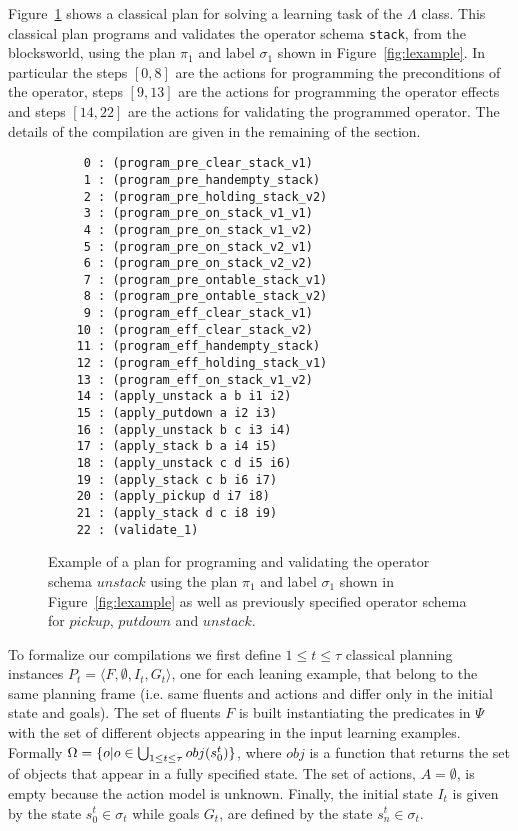 \documentclass[letterpaper]{article} %
\newcommand{\tup}[1]{{\langle #1 \rangle}}
\begin{document}
Figure~\ref{fig:plan} shows a classical plan for solving a learning task of the $\Lambda$ class. This classical plan programs and validates the operator schema {\tt\small stack}, from the blocksworld, using the plan $\pi_1$ and label $\sigma_1$ shown in Figure~\ref{fig:lexample}. In particular the steps $[0,8]$ are the actions for programming the preconditions of the operator, steps $[9,13]$ are the actions for programming the operator effects and steps $[14,22]$ are the actions for validating the programmed operator. The details of the compilation are given in the remaining of the section.

\begin{figure}[hbt]
\begin{scriptsize}
\begin{verbatim}
     0 : (program_pre_clear_stack_v1)
     1 : (program_pre_handempty_stack)
     2 : (program_pre_holding_stack_v2)
     3 : (program_pre_on_stack_v1_v1)
     4 : (program_pre_on_stack_v1_v2)
     5 : (program_pre_on_stack_v2_v1)
     6 : (program_pre_on_stack_v2_v2)
     7 : (program_pre_ontable_stack_v1)
     8 : (program_pre_ontable_stack_v2)
     9 : (program_eff_clear_stack_v1)
    10 : (program_eff_clear_stack_v2)
    11 : (program_eff_handempty_stack)
    12 : (program_eff_holding_stack_v1)
    13 : (program_eff_on_stack_v1_v2)
    14 : (apply_unstack a b i1 i2)
    15 : (apply_putdown a i2 i3)
    16 : (apply_unstack b c i3 i4)
    17 : (apply_stack b a i4 i5)
    18 : (apply_unstack c d i5 i6)
    19 : (apply_stack c b i6 i7)
    20 : (apply_pickup d i7 i8)
    21 : (apply_stack d c i8 i9)
    22 : (validate_1)
\end{verbatim}
\end{scriptsize}
 \caption{\small Example of a plan for programing and validating the operator schema $unstack$ using the plan $\pi_1$ and label $\sigma_1$ shown in Figure~\ref{fig:lexample} as well as previously specified operator schema for $pickup$, $putdown$ and $unstack$.}
\label{fig:plan}
\end{figure}

To formalize our compilations we first define {\small $1\leq t\leq \tau$} classical planning instances $P_t=\tup{F,\emptyset,I_t,G_t}$, one for each leaning example, that belong to the same planning frame (i.e. same fluents and actions and differ only in the initial state and goals). The set of fluents $F$ is built instantiating the predicates in $\Psi$ with the set of different objects appearing in the input learning examples. Formally $\Omega=\{o|o\in \bigcup_{\small 1\leq t\leq \tau} obj(s_0^t)\}$, where $obj$ is a function that returns the set of objects that appear in a fully specified state. The set of actions, $A=\emptyset$, is empty because the action model is unknown. Finally, the initial state $I_t$ is given by the state $s_0^t\in \sigma_t$ while goals $G_t$, are defined by the state $s_n^t\in \sigma_t$. 
\end{document}
